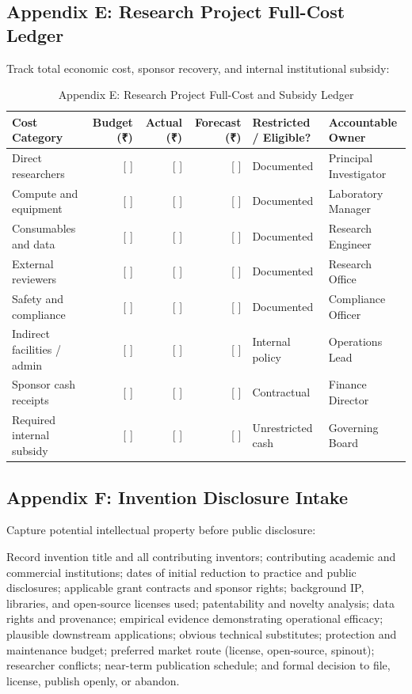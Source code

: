 \subsection{Appendix E: Research Project Full-Cost Ledger}

Track total economic cost, sponsor recovery, and internal institutional subsidy:

\begin{table}[t]
\centering
\small
\caption{Appendix E: Research Project Full-Cost and Subsidy Ledger}
\label{tab:app_e_ledger}
\begin{tabularx}{\textwidth}{p{3.8cm} r r r p{3.2cm} X}
\toprule
\textbf{Cost Category} & \textbf{Budget (\textnormal{₹})} & \textbf{Actual (\textnormal{₹})} & \textbf{Forecast (\textnormal{₹})} & \textbf{Restricted / Eligible?} & \textbf{Accountable Owner} \\
\midrule
Direct researchers & [ ] & [ ] & [ ] & Documented & Principal Investigator \\
Compute and equipment & [ ] & [ ] & [ ] & Documented & Laboratory Manager \\
Consumables and data & [ ] & [ ] & [ ] & Documented & Research Engineer \\
External reviewers & [ ] & [ ] & [ ] & Documented & Research Office \\
Safety and compliance & [ ] & [ ] & [ ] & Documented & Compliance Officer \\
Indirect facilities / admin & [ ] & [ ] & [ ] & Internal policy & Operations Lead \\
\midrule
Sponsor cash receipts & [ ] & [ ] & [ ] & Contractual & Finance Director \\
Required internal subsidy & [ ] & [ ] & [ ] & Unrestricted cash & Governing Board \\
\bottomrule
\end{tabularx}
\end{table}

\subsection{Appendix F: Invention Disclosure Intake}

Capture potential intellectual property before public disclosure:

\begin{tcolorbox}[colback=BayesCanvas,colframe=BayesDark,arc=1mm,title=\textbf{Appendix F: Invention Disclosure Intake Template}]
\scriptsize
Record invention title and all contributing inventors; contributing academic and commercial institutions; dates of initial reduction to practice and public disclosures; applicable grant contracts and sponsor rights; background IP, libraries, and open-source licenses used; patentability and novelty analysis; data rights and provenance; empirical evidence demonstrating operational efficacy; plausible downstream applications; obvious technical substitutes; protection and maintenance budget; preferred market route (license, open-source, spinout); researcher conflicts; near-term publication schedule; and formal decision to file, license, publish openly, or abandon.
\end{tcolorbox}

